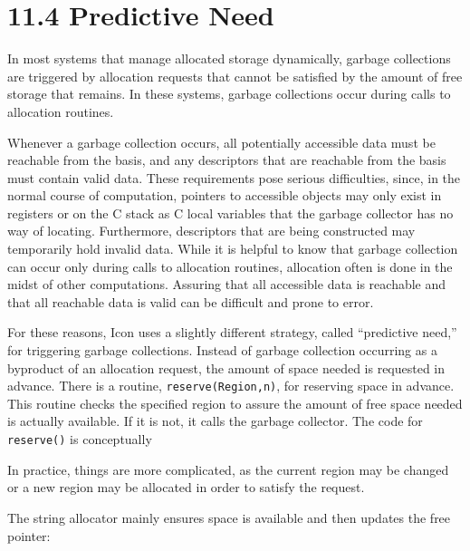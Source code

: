 \section[11.4 Predictive Need]{11.4 Predictive Need}

In most systems that manage allocated storage dynamically, garbage
collections are triggered by allocation requests that cannot be
satisfied by the amount of free storage that remains. In these
systems, garbage collections occur during calls to allocation routines.

Whenever a garbage collection occurs, all potentially accessible data
must be reachable from the basis, and any descriptors that are
reachable from the basis must contain valid data. These requirements
pose serious difficulties, since, in the normal course of computation,
pointers to accessible objects may only exist in registers or on the C
stack as C local variables that the garbage collector has no way of
locating. Furthermore, descriptors that are being constructed may
temporarily hold invalid data. While it is helpful to know that
garbage collection can occur only during calls to allocation routines,
allocation often is done in the midst of other computations. Assuring
that all accessible data is reachable and that all reachable data is
valid can be difficult and prone to error.

For these reasons, Icon uses a slightly different strategy, called
``predictive need,'' for triggering garbage collections. Instead of
garbage collection occurring as a byproduct of an allocation request,
the amount of space needed is requested in advance. There is a
routine, \texttt{reserve(Region,n)}, for reserving space in
advance. This routine checks the specified region to assure the amount
of free space needed is actually available. If it is not, it calls the
garbage collector. The code for \texttt{reserve()} is conceptually

\goodbreak
{}

\noindent
In practice, things are more complicated, as the current region may be
changed or a new region may be allocated in order to satisfy the
request.


The string allocator mainly ensures space is available and then
updates the free pointer:

